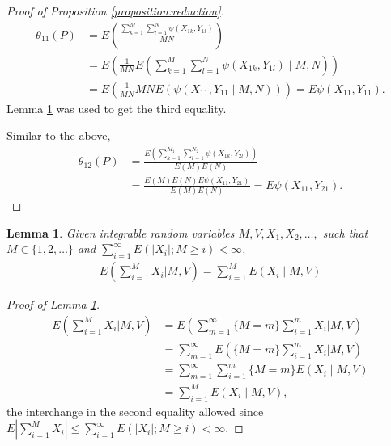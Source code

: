 \documentclass[12pt]{article}
\DeclareMathOperator{\AUC}{AUC}
\newcommand{\E}{E}
\renewcommand{\P}{P}
\newcommand{\cind}{\perp \!\!\! \perp}
\newcommand{\aucindiv}{\theta_{11}}%
\newcommand{\aucpop}{\theta_{12}}%
\newcommand{\kernel}{\psi}
\newtheorem{lemma}[theorem]{Lemma}
\begin{document}
\begin{proof}[Proof of Proposition \ref{proposition:reduction}]
  \begin{align}
    \aucindiv(\P) &= \E\left(\frac{\sum_{k=1}^M\sum_{l=1}^N\kernel(X_{1k},Y_{1l})}{MN}\right)\\
                  &=\E\left(\frac{1}{MN}\E\left(\sum_{k=1}^M\sum_{l=1}^N\kernel(X_{1k},Y_{1l}) \mid M,N\right)\right)\\
                  &=\E\left(\frac{1}{MN}MN\E(\kernel(X_{11},Y_{11}\mid M,N))\right) = \E\kernel(X_{11},Y_{11}).
  \end{align}
  Lemma \ref{lemma:conditional wald} was used to get the third equality.

  Similar to the above,
  \begin{align}
    \aucpop(\P) &= \frac{\E\left(\sum_{k=1}^{M_1}\sum_{l=1}^{N_2}\kernel(X_{1k},Y_{2l})\right)}{\E(M)\E(N)}\\
    &=\frac{\E(M)\E(N)\E\kernel(X_{11},Y_{21})}{\E(M)\E(N)} = \E\kernel(X_{11},Y_{21}).
  \end{align}
\end{proof}


\begin{lemma}\label{lemma:conditional wald}
  Given integrable random variables $M,V,X_1,X_2,\ldots,$ such that $M\in\{1,2,\ldots\}$ and $\sum_{i=1}^\infty E(|X_i|;M\ge i)<\infty$,
  \begin{align}
    \E\left(\sum_{i=1}^M X_i \bigg\vert M,V\right) = \sum_{i=1}^M \E(X_i\mid M,V)
  \end{align}
\end{lemma}
\begin{proof}[Proof of Lemma \ref{lemma:conditional wald}]
  \begin{align}
    \E\left(\sum_{i=1}^M X_i\bigg\vert M,V\right)
    &=  \E\left(\sum_{m=1}^\infty\{M=m\}\sum_{i=1}^m X_i\bigg\vert M,V\right)\\
    &= \sum_{m=1}^\infty \E\left(\{M=m\}\sum_{i=1}^m X_i\bigg\vert M,V\right)\\
    &=\sum_{m=1}^\infty \sum_{i=1}^m\{M=m\}\E(X_i\mid M,V)\\
    &=\sum_{i=1}^M\E(X_i\mid M,V),
  \end{align}
the interchange in the second equality allowed since $E\left|\sum_{i=1}^MX_i\right| \le \sum_{i=1}^\infty E(|X_i|;M\ge i)<\infty.$
\end{proof}
\end{document}
